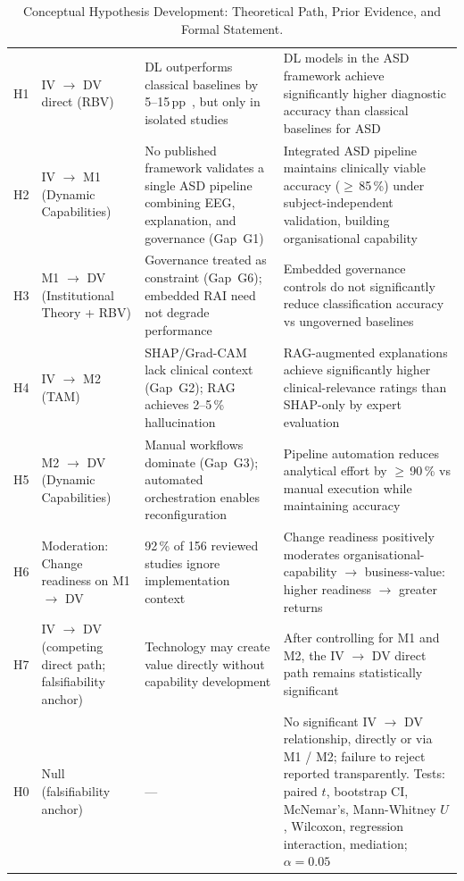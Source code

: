 {\tablestripes\tablefontsize
\begin{xltabular}{\textwidth}{@{} >{\raggedright\arraybackslash}p{1.0cm} >{\raggedright\arraybackslash}p{2.9cm} p{4.4cm} p{5.8cm} @{}}
\caption[Conceptual Hypothesis Development: Theoretical Path,]{Conceptual Hypothesis Development: Theoretical Path, Prior Evidence, and Formal Statement.}\label{tab:hypothesis_development} \\
\toprule
{} &  &  &  \\
\midrule
\endfirsthead
\endhead
\bottomrule
\endlastfoot
H1 & IV $\to$ DV direct (RBV) & DL outperforms classical baselines by 5--15\,pp~\cite{lecun2015deep, goodfellow2016deep}, but only in isolated studies & DL models in the ASD framework achieve significantly higher diagnostic accuracy than classical baselines for ASD \\
\addlinespace
H2 & IV $\to$ M1 (Dynamic Capabilities) & No published framework validates a single ASD pipeline combining EEG, explanation, and governance (Gap~G1) & Integrated ASD pipeline maintains clinically viable accuracy ($\geq$\,85\,\%) under subject-independent validation, building organisational capability \\
\addlinespace
H3 & M1 $\to$ DV (Institutional Theory + RBV) & Governance treated as constraint (Gap~G6); embedded RAI need not degrade performance~\cite{floridi2019trustworthy} & Embedded governance controls do not significantly reduce classification accuracy vs ungoverned baselines \\
\addlinespace
H4 & IV $\to$ M2 (TAM) & SHAP/Grad-CAM lack clinical context (Gap~G2); RAG achieves 2--5\,\% hallucination~\cite{gao2024rag} & RAG-augmented explanations achieve significantly higher clinical-relevance ratings than SHAP-only by expert evaluation \\
\addlinespace
H5 & M2 $\to$ DV (Dynamic Capabilities) & Manual workflows dominate (Gap~G3); automated orchestration enables reconfiguration & Pipeline automation reduces analytical effort by $\geq$\,90\,\% vs manual execution while maintaining accuracy \\
\addlinespace
H6 & Moderation: Change readiness on M1 $\to$ DV & 92\,\% of 156 reviewed studies ignore implementation context~\cite{kotter1996leading, rogers2003diffusion} & Change readiness positively moderates organisational-capability $\to$ business-value: higher readiness $\to$ greater returns \\
\addlinespace
H7 & IV $\to$ DV (competing direct path; falsifiability anchor) & Technology may create value directly without capability development & After controlling for M1 and M2, the IV $\to$ DV direct path remains statistically significant \\
\addlinespace
\midrule
H0 & Null (falsifiability anchor) & --- & No significant IV $\to$ DV relationship, directly or via M1 / M2; failure to reject reported transparently. Tests: paired $t$, bootstrap CI, McNemar's, Mann-Whitney $U$, Wilcoxon, regression interaction, mediation; $\alpha = 0.05$ \\
\end{xltabular}}
